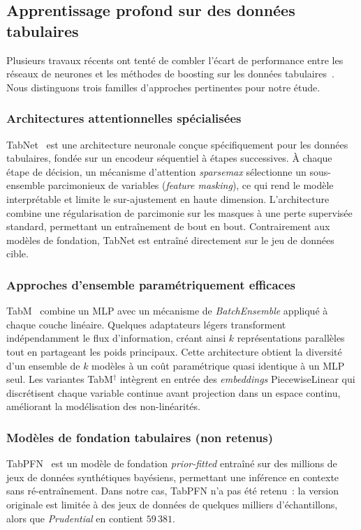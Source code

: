 \documentclass[conference]{IEEEtran}
\begin{document}
\subsection{Apprentissage profond sur des données tabulaires}
\label{subsec:dl-tabulaire}

Plusieurs travaux récents ont tenté de combler l'écart de performance entre les réseaux de neurones et les méthodes de boosting sur les données tabulaires~\cite{grinsztajn2022tree}. Nous distinguons trois familles d'approches pertinentes pour notre étude.

\subsubsection{Architectures attentionnelles spécialisées}
TabNet~\cite{arik2021tabnet} est une architecture neuronale conçue spécifiquement pour les données tabulaires, fondée sur un encodeur séquentiel à étapes successives. À chaque étape de décision, un mécanisme d'attention \textit{sparsemax} sélectionne un sous-ensemble parcimonieux de variables (\emph{feature masking}), ce qui rend le modèle interprétable et limite le sur-ajustement en haute dimension. L'architecture combine une régularisation de parcimonie sur les masques à une perte supervisée standard, permettant un entraînement de bout en bout. Contrairement aux modèles de fondation, TabNet est entraîné directement sur le jeu de données cible.

\subsubsection{Approches d'ensemble paramétriquement efficaces}
TabM~\cite{gorishniy2024tabm} combine un MLP avec un mécanisme de \emph{BatchEnsemble} appliqué à chaque couche linéaire. Quelques adaptateurs légers transforment indépendamment le flux d'information, créant ainsi $k$ représentations parallèles tout en partageant les poids principaux. Cette architecture obtient la diversité d'un ensemble de $k$ modèles à un coût paramétrique quasi identique à un MLP seul. Les variantes TabM$^{\dagger}$ intègrent en entrée des \textit{embeddings} PiecewiseLinear qui discrétisent chaque variable continue avant projection dans un espace continu, améliorant la modélisation des non-linéarités.

\subsubsection{Modèles de fondation tabulaires (non retenus)}
TabPFN~\cite{hollmann2022tabpfn} est un modèle de fondation \emph{prior-fitted} entraîné sur des millions de jeux de données synthétiques bayésiens, permettant une inférence en contexte sans ré-entraînement. Dans notre cas, TabPFN n'a pas été retenu~: la version originale est limitée à des jeux de données de quelques milliers d'échantillons, alors que \textit{Prudential} en contient $59\,381$.
\end{document}

